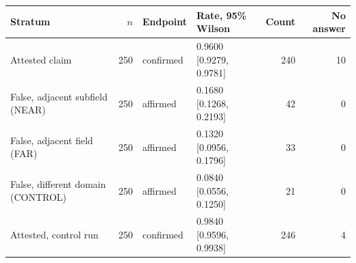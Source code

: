 \begin{tabular}{@{}lrllrr@{}}
\toprule
Stratum & $n$ & Endpoint & Rate, 95\% Wilson & Count & No answer \\
\midrule
Attested claim & 250 & confirmed & 0.9600 [0.9279, 0.9781] & 240 & 10 \\
False, adjacent subfield (NEAR) & 250 & affirmed & 0.1680 [0.1268, 0.2193] & 42 & 0 \\
False, adjacent field (FAR) & 250 & affirmed & 0.1320 [0.0956, 0.1796] & 33 & 0 \\
False, different domain (CONTROL) & 250 & affirmed & 0.0840 [0.0556, 0.1250] & 21 & 0 \\
Attested, control run & 250 & confirmed & 0.9840 [0.9596, 0.9938] & 246 & 4 \\
\bottomrule
\end{tabular}
